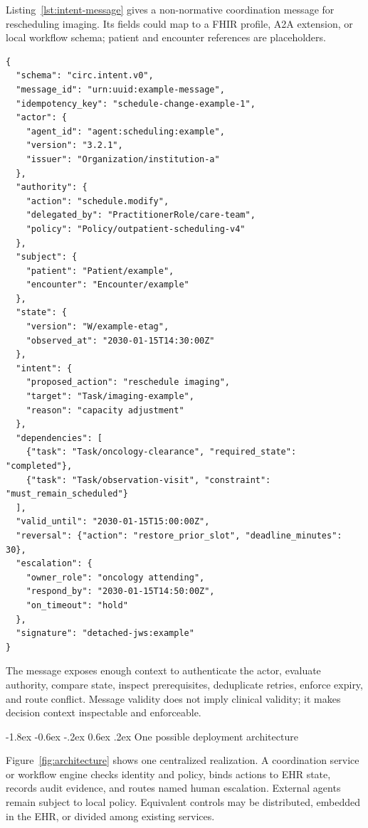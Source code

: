 \documentclass[10pt]{article}
\makeatletter
\renewcommand\subsection{\@startsection{subsection}{2}{\z@}%
  {-1.8ex \@plus -0.6ex \@minus -.2ex}%
  {0.6ex \@plus .2ex}%
  {\normalfont\sffamily\bfseries\normalsize}}
\makeatother
\begin{document}
Listing~\ref{lst:intent-message} gives a non-normative coordination message for rescheduling imaging.
Its fields could map to a FHIR profile, A2A extension, or local workflow schema; patient and encounter
references are placeholders.

\begin{lstlisting}[style=circjson,caption={Illustrative structured coordination message.},label={lst:intent-message}]
{
  "schema": "circ.intent.v0",
  "message_id": "urn:uuid:example-message",
  "idempotency_key": "schedule-change-example-1",
  "actor": {
    "agent_id": "agent:scheduling:example",
    "version": "3.2.1",
    "issuer": "Organization/institution-a"
  },
  "authority": {
    "action": "schedule.modify",
    "delegated_by": "PractitionerRole/care-team",
    "policy": "Policy/outpatient-scheduling-v4"
  },
  "subject": {
    "patient": "Patient/example",
    "encounter": "Encounter/example"
  },
  "state": {
    "version": "W/example-etag",
    "observed_at": "2030-01-15T14:30:00Z"
  },
  "intent": {
    "proposed_action": "reschedule imaging",
    "target": "Task/imaging-example",
    "reason": "capacity adjustment"
  },
  "dependencies": [
    {"task": "Task/oncology-clearance", "required_state": "completed"},
    {"task": "Task/observation-visit", "constraint": "must_remain_scheduled"}
  ],
  "valid_until": "2030-01-15T15:00:00Z",
  "reversal": {"action": "restore_prior_slot", "deadline_minutes": 30},
  "escalation": {
    "owner_role": "oncology attending",
    "respond_by": "2030-01-15T14:50:00Z",
    "on_timeout": "hold"
  },
  "signature": "detached-jws:example"
}
\end{lstlisting}

The message exposes enough context to authenticate the actor, evaluate authority, compare state,
inspect prerequisites, deduplicate retries, enforce expiry, and route conflict. Message validity does
not imply clinical validity; it makes decision context inspectable and enforceable.

\subsection{One possible deployment architecture}

Figure~\ref{fig:architecture} shows one centralized realization. A coordination service or workflow
engine checks identity and policy, binds actions to EHR state, records audit evidence, and routes
named human escalation. External agents remain subject to local policy. Equivalent controls may be
distributed, embedded in the EHR, or divided among existing services.
\end{document}
